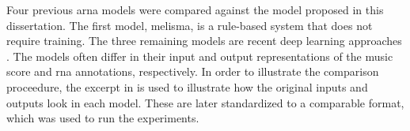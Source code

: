 
Four previous \gls{arna} models were compared against the
model proposed in this dissertation. The first model,
\gls{melisma}, is a rule-based system that does not require
training. The three remaining models are recent deep
learning approaches \parencite{chen2021attend,
micchi2021deep, mcleod2021modular}. The models often differ
in their input and output representations of the music score
and \gls{rna} annotations, respectively. In order to
illustrate the comparison proceedure, the excerpt in
 is used to illustrate
how the original inputs and outputs look in each model.
These are later standardized to a comparable format, which
was used to run the experiments.

